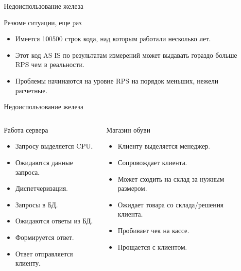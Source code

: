 \documentclass[aspectratio=169]{beamer}
\begin{document}
\begin{frame}{Недоиспользование железа}
    \begin{block}{Резюме ситуации, еще раз}
        \begin{itemize}
            \item Имеется 100500 строк кода,
                над которым работали несколько лет.

            \item Этот код AS IS по результатам измерений
                может выдавать гораздо больше RPS чем в реальности.

            \item Проблемы начинаются на уровне RPS на порядок меньших,
                нежели расчетные.
        \end{itemize}
    \end{block}
\end{frame}


\begin{frame}{Недоиспользование железа}
    \begin{columns}
            \begin{block}{Работа сервера}
                \begin{itemize}
                    \item Запросу выделяется CPU.
                    \item Ожидаются данные запроса.
                    \item Диспетчеризация.
                    \item Запросы в БД.
                    \item Ожидаются ответы из БД.
                    \item Формируется ответ.
                    \item Ответ отправляется клиенту.
                \end{itemize}
            \end{block}
        \pause
            \begin{block}{Магазин обуви}
                \begin{itemize}
                    \item Клиенту выделяется менеджер.
                    \item Сопровождает клиента.
                    \item Может сходить на склад за нужным размером.
                    \item Ожидает товара со склада/решения клиента.
                    \item Пробивает чек на кассе.
                    \item Прощается с клиентом.
                \end{itemize}
            \end{block}
    \end{columns}
\end{frame}
\end{document}

